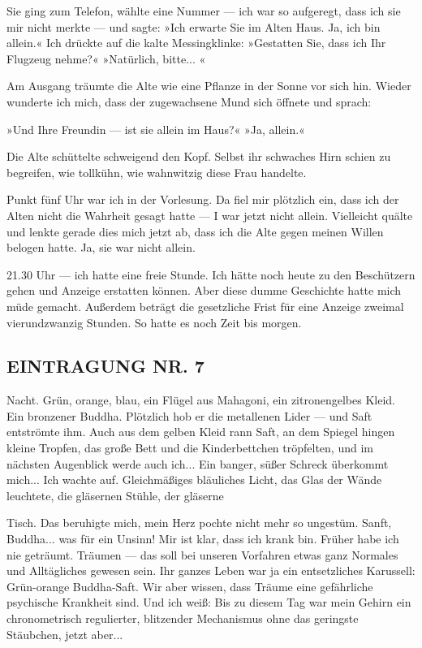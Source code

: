 Sie ging zum Telefon, wählte eine Nummer — ich war so aufgeregt,
dass ich sie mir nicht merkte — und sagte: »Ich erwarte Sie im
Alten Haus. Ja, ich bin allein.« Ich drückte auf die kalte
Messingklinke: »Gestatten Sie, dass ich Ihr Flugzeug nehme?«
»Natürlich, bitte... «

Am Ausgang träumte die Alte wie eine Pflanze in der Sonne vor sich
hin. Wieder wunderte ich mich, dass der zugewachsene Mund sich
öffnete und sprach:

»Und Ihre Freundin — ist sie allein im Haus?« »Ja, allein.«

Die Alte schüttelte schweigend den Kopf. Selbst ihr schwaches Hirn
schien zu begreifen, wie tollkühn, wie wahnwitzig diese Frau
handelte.

Punkt fünf Uhr war ich in der Vorlesung. Da fiel mir plötzlich ein,
dass ich der Alten nicht die Wahrheit gesagt hatte — I war jetzt
nicht allein. Vielleicht quälte und lenkte gerade dies mich jetzt
ab, dass ich die Alte gegen meinen Willen belogen hatte. Ja, sie
war nicht allein.

21.30 Uhr — ich hatte eine freie Stunde. Ich hätte noch heute zu
den Beschützern gehen und Anzeige erstatten können. Aber diese
dumme Geschichte hatte mich müde gemacht. Außerdem beträgt die
gesetzliche Frist für eine Anzeige zweimal vierundzwanzig Stunden.
So hatte es noch Zeit bis morgen.

\subsection{EINTRAGUNG NR. 7}

Nacht. Grün, orange, blau, ein Flügel aus Mahagoni, ein
zitronengelbes Kleid. Ein bronzener Buddha. Plötzlich hob er die
metallenen Lider — und Saft entströmte ihm. Auch aus dem gelben
Kleid rann Saft, an dem Spiegel hingen kleine Tropfen, das große
Bett und die Kinderbettchen tröpfelten, und im nächsten Augenblick
werde auch ich... Ein banger, süßer Schreck überkommt mich... Ich
wachte auf. Gleichmäßiges bläuliches Licht, das Glas der Wände
leuchtete, die gläsernen Stühle, der gläserne

Tisch. Das beruhigte mich, mein Herz pochte nicht mehr so ungestüm.
Sanft, Buddha... was für ein Unsinn! Mir ist klar, dass ich krank
bin. Früher habe ich nie geträumt. Träumen — das soll bei unseren
Vorfahren etwas ganz Normales und Alltägliches gewesen sein. Ihr
ganzes Leben war ja ein entsetzliches Karussell: Grün-orange
Buddha-Saft. Wir aber wissen, dass Träume eine gefährliche
psychische Krankheit sind. Und ich weiß: Bis zu diesem Tag war mein
Gehirn ein chronometrisch regulierter, blitzender Mechanismus ohne
das geringste Stäubchen, jetzt aber...

